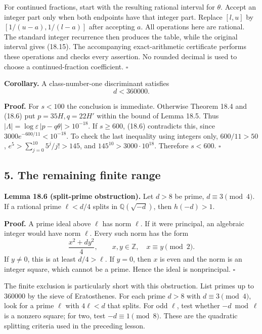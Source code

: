 \documentclass[
  11pt,
  a4paper,
]{article}
\begin{document}
For continued fractions, start with the resulting rational interval for
\(\theta\). Accept an integer part only when both endpoints have that
integer part. Replace \([l,u]\) by \([1/(u-a),1/(l-a)]\) after accepting
\(a\). All operations here are rational. The standard integer recurrence
then produces the table, while the original interval gives (18.15). The
accompanying exact-arithmetic certificate performs these operations and
checks every assertion. No rounded decimal is used to choose a
continued-fraction coefficient. \(\square\)

\textbf{Corollary.} A class-number-one discriminant satisfies \[
 d<360000.
 \tag{18.17}
\]

\textbf{Proof.} For \(s<100\) the conclusion is immediate. Otherwise
Theorem 18.4 and (18.6) put \(p=35H,q=22H'\) within the bound of Lemma
18.5. Thus \(|\Lambda|=\log\varepsilon\,|p-q\theta|>10^{-18}\). If
\(s\ge600\), (18.6) contradicts this, since
\(3000e^{-600/11}<10^{-18}\). To check the last inequality using
integers only, \(600/11>50\), \(e^5>\sum_{j=0}^{10}5^j/j!>145\), and
\(145^{10}>3000\cdot10^{18}\). Therefore \(s<600\). \(\square\)

\subsection{5. The remaining finite
range}\label{the-remaining-finite-range}

\textbf{Lemma 18.6 (split-prime obstruction).} Let \(d>8\) be prime,
\(d\equiv3\pmod4\). If a rational prime \(\ell<d/4\) splits in
\(\mathbb Q(\sqrt{-d})\), then \(h(-d)>1\).

\textbf{Proof.} A prime ideal above \(\ell\) has norm \(\ell\). If it
were principal, an algebraic integer would have norm \(\ell\). Every
such norm has the form \[
 \frac{x^2+dy^2}{4},\qquad x,y\in\mathbb Z,
 \quad x\equiv y\pmod2.
 \tag{18.18}
\] If \(y\ne0\), this is at least \(d/4>\ell\). If \(y=0\), then \(x\)
is even and the norm is an integer square, which cannot be a prime.
Hence the ideal is nonprincipal. \(\square\)

The finite exclusion is particularly short with this obstruction. List
primes up to \(360000\) by the sieve of Eratosthenes. For each prime
\(d>8\) with \(d\equiv3\pmod4\), look for a prime \(\ell\) with
\(4\ell<d\) that splits. For odd \(\ell\), test whether \(-d\bmod\ell\)
is a nonzero square; for two, test \(-d\equiv1\pmod8\). These are the
quadratic splitting criteria used in the preceding lesson.
\end{document}
